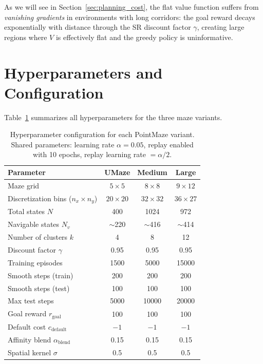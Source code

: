 \documentclass[11pt,a4paper]{article}
\begin{document}
As we will see in Section~\ref{sec:planning_cost}, the flat value function suffers from \emph{vanishing gradients} in environments with long corridors: the goal reward decays exponentially with distance through the SR discount factor $\gamma$, creating large regions where $V$ is effectively flat and the greedy policy is uninformative.

\section{Hyperparameters and Configuration}
\label{sec:hyperparams}

Table~\ref{tab:hyperparams} summarizes all hyperparameters for the three maze variants.

\begin{table}[ht]
\centering
\caption{Hyperparameter configuration for each PointMaze variant. Shared parameters: learning rate $\alpha = 0.05$, replay enabled with 10 epochs, replay learning rate $= \alpha/2$.}
\label{tab:hyperparams}
\begin{tabular}{lccc}
\toprule
\textbf{Parameter} & \textbf{UMaze} & \textbf{Medium} & \textbf{Large} \\
\midrule
Maze grid & $5 \times 5$ & $8 \times 8$ & $9 \times 12$ \\
Discretization bins ($n_x \times n_y$) & $20 \times 20$ & $32 \times 32$ & $36 \times 27$ \\
Total states $N$ & 400 & 1024 & 972 \\
Navigable states $N_v$ & $\sim$220 & $\sim$416 & $\sim$414 \\
Number of clusters $k$ & 4 & 8 & 12 \\
Discount factor $\gamma$ & 0.95 & 0.95 & 0.95 \\
Training episodes & 1500 & 5000 & 15000 \\
Smooth steps (train) & 200 & 200 & 200 \\
Smooth steps (test) & 100 & 100 & 100 \\
Max test steps & 5000 & 10000 & 20000 \\
Goal reward $r_{\text{goal}}$ & 100 & 100 & 100 \\
Default cost $c_{\text{default}}$ & $-1$ & $-1$ & $-1$ \\
Affinity blend $\alpha_{\text{blend}}$ & 0.15 & 0.15 & 0.15 \\
Spatial kernel $\sigma$ & 0.5 & 0.5 & 0.5 \\
\bottomrule
\end{tabular}
\end{table}
\end{document}
